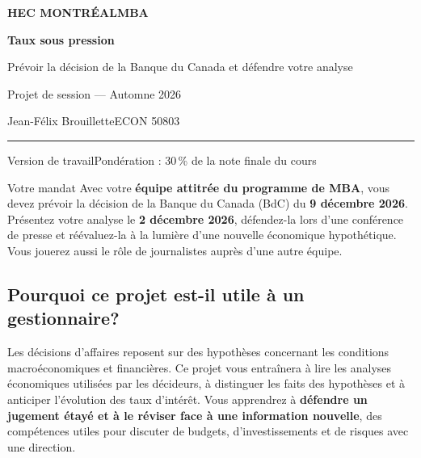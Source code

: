 \documentclass[11pt,letterpaper]{article}
\begin{document}
\thispagestyle{premiere}
\begin{flushleft}
{\small\bfseries\color{HECnavy} HEC MONTRÉAL\enspace\textbar\enspace MBA}\par
\vspace{5pt}
{\fontsize{24}{28}\selectfont\bfseries\color{HECnavy} Taux sous pression}\par
\vspace{5pt}
{\large\color{HECnavy} Prévoir la décision de la Banque du Canada et défendre votre analyse}\par
\vspace{5pt}
{\small\color{HECnavy} Projet de session --- Automne 2026}\par
{\small Jean-Félix Brouillette\enspace\textbar\enspace ECON 50803}\par
{\color{HECgreen}\rule{3cm}{2pt}}
\end{flushleft}
\vspace{-5pt}
{\small\textcolor{HECgray}{Version de travail\enspace\textbar\enspace Pondération : 30\,\% de la note finale du cours}}

\begin{consigne}{Votre mandat}
Avec votre \textbf{équipe attitrée du programme de MBA}, vous devez prévoir la décision de la Banque du Canada (BdC) du \textbf{9 décembre 2026}. Présentez votre analyse le \textbf{2 décembre 2026}, défendez-la lors d'une conférence de presse et réévaluez-la à la lumière d'une nouvelle économique hypothétique. Vous jouerez aussi le rôle de journalistes auprès d'une autre équipe.
\end{consigne}

\vspace{0.15cm}

\subsection{Pourquoi ce projet est-il utile à un gestionnaire?}
Les décisions d'affaires reposent sur des hypothèses concernant les conditions macroéconomiques et financières. Ce projet vous entraînera à lire les analyses économiques utilisées par les décideurs, à distinguer les faits des hypothèses et à anticiper l'évolution des taux d'intérêt. Vous apprendrez à \textbf{défendre un jugement étayé et à le réviser face à une information nouvelle}, des compétences utiles pour discuter de budgets, d'investissements et de risques avec une direction.
\end{document}
